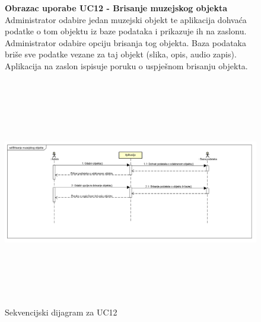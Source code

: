 				\begin{figure}[H]
					\textbf{Obrazac uporabe UC12 - Brisanje muzejskog objekta} 
					\newline
					\newline
					Administrator odabire jedan muzejski objekt te aplikacija dohvaća podatke o tom objektu iz baze podataka i prikazuje ih na zaslonu. Administrator odabire opciju brisanja tog objekta. Baza podataka briše sve podatke vezane za taj objekt (slika, opis, audio zapis). Aplikacija na zaslon ispisuje poruku o uspješnom brisanju objekta. \par
					\includegraphics[width=170mm,height=100mm]{slike/Brisanje_muzejskog_objekta.png} 
					\newline
					\centering
					\caption{Sekvencijski dijagram za UC12}
					\label{fig:promjene}
				\end{figure}
				
